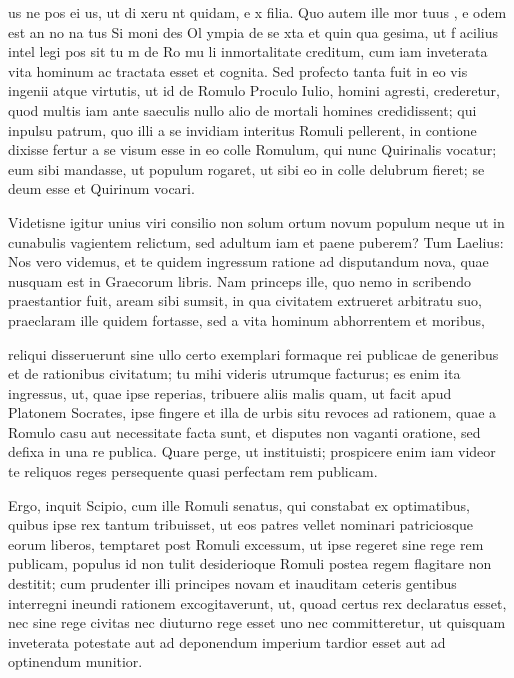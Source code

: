  us ne pos ei us, ut di xeru nt quidam, e x filia. Quo autem ille mor tuus , e odem est an no na tus Si moni des Ol ympia de se xta et quin qua gesima, ut f acilius intel legi pos sit tu m de Ro mu li inmortalitate creditum, cum iam inveterata vita hominum ac tractata esset et cognita. Sed profecto tanta fuit in eo vis ingenii atque virtutis, ut id de Romulo Proculo Iulio, homini agresti, crederetur, quod multis iam ante saeculis nullo alio de mortali homines credidissent; qui inpulsu patrum, quo illi a se invidiam interitus Romuli pellerent, in contione dixisse fertur a se visum esse in eo colle Romulum, qui nunc Quirinalis vocatur; eum sibi mandasse, ut populum rogaret, ut sibi eo in colle delubrum fieret; se deum esse et Quirinum vocari.

 Videtisne igitur unius viri consilio non solum ortum novum populum neque ut in cunabulis vagientem relictum, sed adultum iam et paene puberem? Tum Laelius: Nos vero videmus, et te quidem ingressum ratione ad disputandum nova, quae nusquam est in Graecorum libris. Nam princeps ille, quo nemo in scribendo praestantior fuit, aream sibi sumsit, in qua civitatem extrueret arbitratu suo, praeclaram ille quidem fortasse, sed a vita hominum abhorrentem et moribus,

 reliqui disseruerunt sine ullo certo exemplari formaque rei publicae de generibus et de rationibus civitatum; tu mihi videris utrumque facturus; es enim ita ingressus, ut, quae ipse reperias, tribuere aliis malis quam, ut facit apud Platonem Socrates, ipse fingere et illa de urbis situ revoces ad rationem, quae a Romulo casu aut necessitate facta sunt, et disputes non vaganti oratione, sed defixa in una re publica. Quare perge, ut instituisti; prospicere enim iam videor te reliquos reges persequente quasi perfectam rem publicam.

 Ergo, inquit Scipio, cum ille Romuli senatus, qui constabat ex optimatibus, quibus ipse rex tantum tribuisset, ut eos patres vellet nominari patriciosque eorum liberos, temptaret post Romuli excessum, ut ipse regeret sine rege rem publicam, populus id non tulit desiderioque Romuli postea regem flagitare non destitit; cum prudenter illi principes novam et inauditam ceteris gentibus interregni ineundi rationem excogitaverunt, ut, quoad certus rex declaratus esset, nec sine rege civitas nec diuturno rege esset uno nec committeretur, ut quisquam inveterata potestate aut ad deponendum imperium tardior esset aut ad optinendum munitior.


